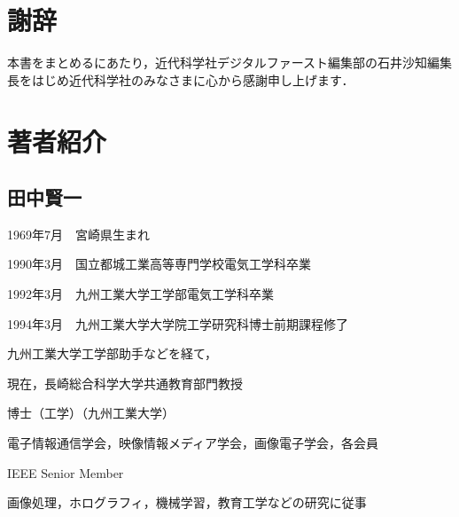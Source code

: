 \chapter{謝辞}

本書をまとめるにあたり，近代科学社デジタルファースト編集部の石井沙知編集長をはじめ近代科学社のみなさまに心から感謝申し上げます．

\chapter{著者紹介}

\section*{田中賢一}

1969年7月　宮崎県生まれ

1990年3月　国立都城工業高等専門学校電気工学科卒業

1992年3月　九州工業大学工学部電気工学科卒業

1994年3月　九州工業大学大学院工学研究科博士前期課程修了

九州工業大学工学部助手などを経て，

現在，長崎総合科学大学共通教育部門教授

博士（工学）（九州工業大学）

電子情報通信学会，映像情報メディア学会，画像電子学会，各会員

IEEE Senior Member

画像処理，ホログラフィ，機械学習，教育工学などの研究に従事



